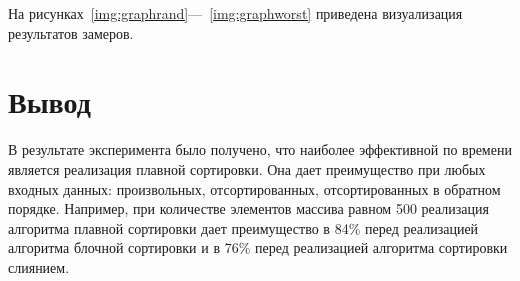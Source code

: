 На рисунках~\ref{img:graphrand}---~\ref{img:graphworst} приведена визуализация результатов замеров.




\section{Вывод}

В результате эксперимента было получено, что наиболее эффективной по времени является реализация плавной сортировки. Она дает преимущество при любых входных данных: произвольных, отсортированных, отсортированных в обратном порядке. Например, при количестве элементов массива равном 500 реализация алгоритма плавной сортировки дает преимущество в 84\% перед реализацией алгоритма блочной сортировки и в 76\% перед реализацией алгоритма сортировки слиянием.